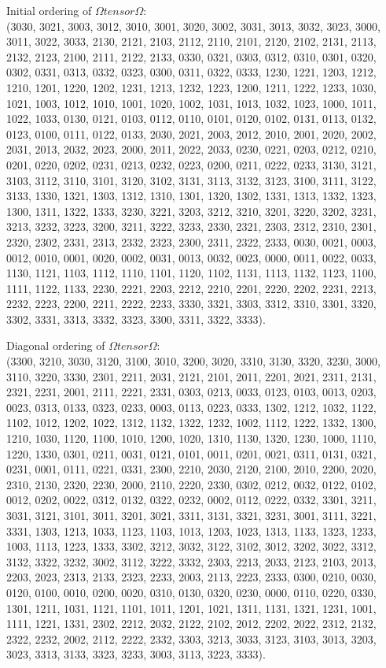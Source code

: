 \documentclass[10pt,a4paper]{amsart}
\numberwithin{equation}{section}
\theoremstyle{definition}
\def\otimes{ tensor }
\begin{document}
Initial ordering of $\Omega \otimes \Omega$:\\
(3030, 3021, 3003, 3012, 3010, 3001, 3020, 3002, 3031, 3013, 3032, 3023, 3000, 3011, 3022, 3033, 2130, 2121, 2103, 2112, 2110, 2101, 2120, 2102, 2131, 2113, 2132, 2123, 2100, 2111, 2122, 2133, 0330, 0321, 0303, 0312, 0310, 0301, 0320, 0302, 0331, 0313, 0332, 0323, 0300, 0311, 0322, 0333, 1230, 1221, 1203, 1212, 1210, 1201, 1220, 1202, 1231, 1213, 1232, 1223, 1200, 1211, 1222, 1233, 1030, 1021, 1003, 1012, 1010, 1001, 1020, 1002, 1031, 1013, 1032, 1023, 1000, 1011, 1022, 1033, 0130, 0121, 0103, 0112, 0110, 0101, 0120, 0102, 0131, 0113, 0132, 0123, 0100, 0111, 0122, 0133, 2030, 2021, 2003, 2012, 2010, 2001, 2020, 2002, 2031, 2013, 2032, 2023, 2000, 2011, 2022, 2033, 0230, 0221, 0203, 0212, 0210, 0201, 0220, 0202, 0231, 0213, 0232, 0223, 0200, 0211, 0222, 0233, 3130, 3121, 3103, 3112, 3110, 3101, 3120, 3102, 3131, 3113, 3132, 3123, 3100, 3111, 3122, 3133, 1330, 1321, 1303, 1312, 1310, 1301, 1320, 1302, 1331, 1313, 1332, 1323, 1300, 1311, 1322, 1333, 3230, 3221, 3203, 3212, 3210, 3201, 3220, 3202, 3231, 3213, 3232, 3223, 3200, 3211, 3222, 3233, 2330, 2321, 2303, 2312, 2310, 2301, 2320, 2302, 2331, 2313, 2332, 2323, 2300, 2311, 2322, 2333, 0030, 0021, 0003, 0012, 0010, 0001, 0020, 0002, 0031, 0013, 0032, 0023, 0000, 0011, 0022, 0033, 1130, 1121, 1103, 1112, 1110, 1101, 1120, 1102, 1131, 1113, 1132, 1123, 1100, 1111, 1122, 1133, 2230, 2221, 2203, 2212, 2210, 2201, 2220, 2202, 2231, 2213, 2232, 2223, 2200, 2211, 2222, 2233, 3330, 3321, 3303, 3312, 3310, 3301, 3320, 3302, 3331, 3313, 3332, 3323, 3300, 3311, 3322, 3333).

Diagonal ordering of $\Omega \otimes \Omega$:\\
(3300, 3210, 3030, 3120, 3100, 3010, 3200, 3020, 3310, 3130, 3320, 3230, 3000, 3110, 3220, 3330, 2301, 2211, 2031, 2121, 2101, 2011, 2201, 2021, 2311, 2131, 2321, 2231, 2001, 2111, 2221, 2331, 0303, 0213, 0033, 0123, 0103, 0013, 0203, 0023, 0313, 0133, 0323, 0233, 0003, 0113, 0223, 0333, 1302, 1212, 1032, 1122, 1102, 1012, 1202, 1022, 1312, 1132, 1322, 1232, 1002, 1112, 1222, 1332, 1300, 1210, 1030, 1120, 1100, 1010, 1200, 1020, 1310, 1130, 1320, 1230, 1000, 1110, 1220, 1330, 0301, 0211, 0031, 0121, 0101, 0011, 0201, 0021, 0311, 0131, 0321, 0231, 0001, 0111, 0221, 0331, 2300, 2210, 2030, 2120, 2100, 2010, 2200, 2020, 2310, 2130, 2320, 2230, 2000, 2110, 2220, 2330, 0302, 0212, 0032, 0122, 0102, 0012, 0202, 0022, 0312, 0132, 0322, 0232, 0002, 0112, 0222, 0332, 3301, 3211, 3031, 3121, 3101, 3011, 3201, 3021, 3311, 3131, 3321, 3231, 3001, 3111, 3221, 3331, 1303, 1213, 1033, 1123, 1103, 1013, 1203, 1023, 1313, 1133, 1323, 1233, 1003, 1113, 1223, 1333, 3302, 3212, 3032, 3122, 3102, 3012, 3202, 3022, 3312, 3132, 3322, 3232, 3002, 3112, 3222, 3332, 2303, 2213, 2033, 2123, 2103, 2013, 2203, 2023, 2313, 2133, 2323, 2233, 2003, 2113, 2223, 2333, 0300, 0210, 0030, 0120, 0100, 0010, 0200, 0020, 0310, 0130, 0320, 0230, 0000, 0110, 0220, 0330, 1301, 1211, 1031, 1121, 1101, 1011, 1201, 1021, 1311, 1131, 1321, 1231, 1001, 1111, 1221, 1331, 2302, 2212, 2032, 2122, 2102, 2012, 2202, 2022, 2312, 2132, 2322, 2232, 2002, 2112, 2222, 2332, 3303, 3213, 3033, 3123, 3103, 3013, 3203, 3023, 3313, 3133, 3323, 3233, 3003, 3113, 3223, 3333).
\end{document}
